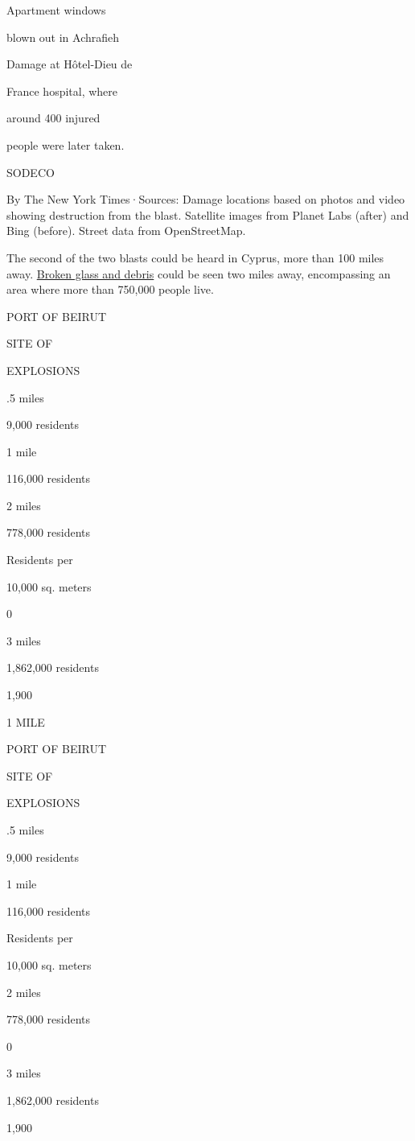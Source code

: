 Apartment windows

blown out in Achrafieh

Damage at Hôtel-Dieu de

France hospital, where

around 400 injured

people were later taken.

SODECO

By The New York Times·Sources: Damage locations based on photos and
video showing destruction from the blast. Satellite images from Planet
Labs (after) and Bing (before). Street data from OpenStreetMap.

The second of the two blasts could be heard in Cyprus, more than 100
miles away.
\href{https://twitter.com/MinaSohail/status/1290707117264064512}{Broken
glass and debris} could be seen two miles away, encompassing an area
where more than 750,000 people live.

PORT OF BEIRUT

SITE OF

EXPLOSIONS

.5 miles

9,000 residents

1 mile

116,000 residents

2 miles

778,000 residents

Residents per

10,000 sq. meters

0

3 miles

1,862,000 residents

1,900

1 MILE

PORT OF BEIRUT

SITE OF

EXPLOSIONS

.5 miles

9,000 residents

1 mile

116,000 residents

Residents per

10,000 sq. meters

2 miles

778,000 residents

0

3 miles

1,862,000 residents

1,900

